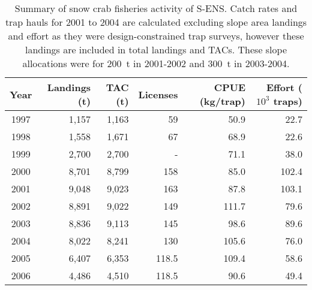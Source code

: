 \documentclass[11pt]{article}
\begin{document}
\begin{table}
\caption{Summary of snow crab fisheries activity of S-ENS. Catch rates and trap hauls for 2001 to 2004 are calculated excluding slope area landings and effort as they were design-constrained trap surveys, however these landings are included in total landings and TACs. These slope allocations were for 200~t in 2001-2002 and 300~t in 2003-2004.}
\label{tab:fisheries.summary.south}
\begin{center}
\begin{tabular}{c r r r r r}
\hline \hline
Year & Landings (t) & TAC (t) & Licenses & CPUE (kg/trap) & Effort ($10^3$ traps) \\
\hline
1997 & 1,157 & 1,163 &  59 &  50.9  &  22.7 \\
1998 & 1,558 & 1,671 &  67 &  68.9  &  22.6 \\
1999 & 2,700 & 2,700 &  -  &  71.1  &  38.0 \\
2000 & 8,701 & 8,799 & 158 &  85.0  & 102.4  \\
2001 & 9,048 & 9,023 & 163 &  87.8  & 103.1  \\
2002 & 8,891 & 9,022 & 149 & 111.7  &  79.6  \\
2003 & 8,836 & 9,113 & 145 &  98.6  &  89.6   \\
2004 & 8,022 & 8,241 & 130 & 105.6  &  76.0  \\
2005 & 6,407 & 6,353 & 118.5 & 109.4  &  58.6  \\
2006 & 4,486 & 4,510 & 118.5 &  90.6  &  49.4  \\
\hline
\end{tabular}
\end{center}
\end{table}
\end{document}
